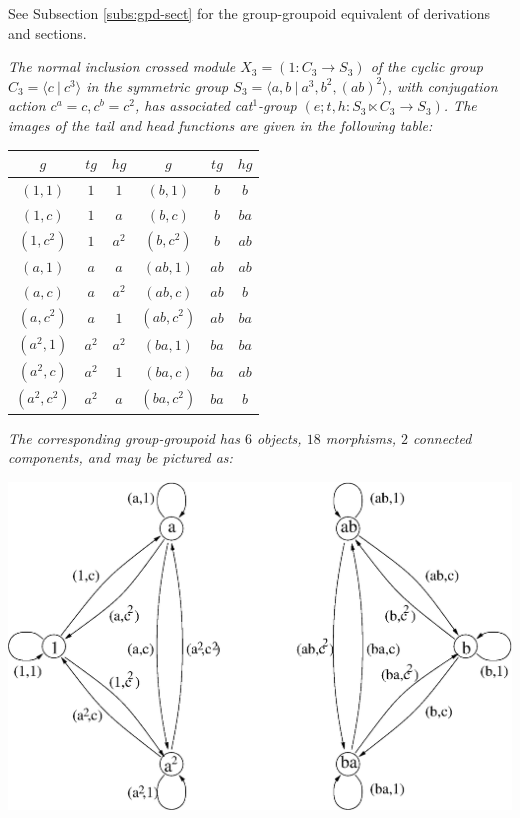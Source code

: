 \bigskip\noindent
See Subsection \ref{subs:gpd-sect} for the group-groupoid 
equivalent of derivations and sections.


\bigskip
\begin{example}
\emph{The normal inclusion crossed module $X_3 = (1 : C_3 \to S_3)$ 
of the cyclic group $C_3 = \langle c ~|~ c^3 \rangle$ 
in the symmetric group $S_3 = \langle a,b ~|~ a^3, b^2, (ab)^2 \rangle$,
with conjugation action $c^a=c, c^b=c^2$,
has associated cat$^1$-group $(e;t,h : S_3 \ltimes C_3 \to S_3)$.
The images of the tail and head functions are given in the following table:}
\begin{center}
\begin{tabular}{|ccc|ccc|}
\hline
$g$ & $tg$ & $hg$ & $g$ & $tg$ & $hg$ \\
\hline
$(1,1)$ & $1$ & $1$ &        $(b,1)$ & $b$ & $b$ \\
$(1,c)$ & $1$ & $a$ &        $(b,c)$ & $b$ & $ba$ \\
$(1,c^2)$ & $1$ & $a^2$ &    $(b,c^2)$ & $b$ & $ab$ \\
$(a,1)$ & $a$ & $a$ &        $(ab,1)$ & $ab$ & $ab$ \\
$(a,c)$ & $a$ & $a^2$ &      $(ab,c)$ & $ab$ & $b$ \\
$(a,c^2)$ & $a$ & $1$ &      $(ab,c^2)$ & $ab$ & $ba$ \\
$(a^2,1)$ & $a^2$ & $a^2$ &  $(ba,1)$ & $ba$ & $ba$ \\
$(a^2,c)$ & $a^2$ & $1$ &    $(ba,c)$ & $ba$ & $ab$ \\
$(a^2,c^2)$ & $a^2$ & $a$ &  $(ba,c^2)$ & $ba$ & $b$ \\
\hline
\end{tabular}
\end{center}
\emph{The corresponding group-groupoid has $6$ objects, $18$ morphisms, 
$2$ connected components, and may be pictured as:}
\begin{center}
\includegraphics[scale = 0.65]{xmodcat1/s3ggpd.eps}
\end{center}


\end{example}
